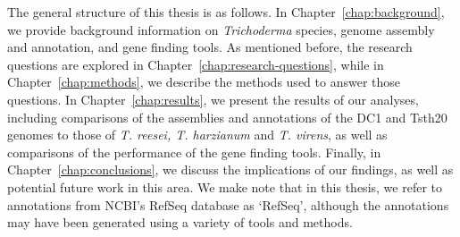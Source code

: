 The general structure of this thesis is as follows. In Chapter~\ref{chap:background}, we provide background information on \textit{Trichoderma} species, genome assembly and annotation, and gene finding tools. As mentioned before, the research questions are explored in Chapter~\ref{chap:research-questions}, while in Chapter~\ref{chap:methods}, we describe the methods used to answer those questions. In Chapter~\ref{chap:results}, we present the results of our analyses, including comparisons of the assemblies and annotations of the DC1 and Tsth20 genomes to those of \textit{T. reesei, T. harzianum} and \textit{T. virens}, as well as comparisons of the performance of the gene finding tools. Finally, in Chapter~\ref{chap:conclusions}, we discuss the implications of our findings, as well as potential future work in this area. We make note that in this thesis, we refer to annotations from NCBI's RefSeq database as `RefSeq', although the annotations may have been generated using a variety of tools and methods. 
